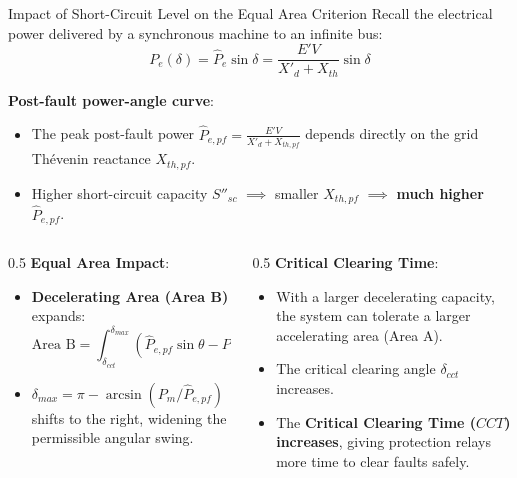 \begin{frame}[allowframebreaks]{Impact of Short-Circuit Level on the Equal Area Criterion}
Recall the electrical power delivered by a synchronous machine to an infinite bus:
$$P_e(\delta) = \hat{P}_e \sin \delta = \frac{E' V}{X'_d + X_{th}} \sin \delta$$

\textbf{Post-fault power-angle curve}:
\begin{itemize}
    \item The peak post-fault power $\hat{P}_{e,pf} = \frac{E' V}{X'_d + X_{th,pf}}$ depends directly on the grid Thévenin reactance $X_{th,pf}$.
    \item Higher short-circuit capacity $S''_{sc}$ $\implies$ smaller $X_{th,pf}$ $\implies$ \textbf{much higher $\hat{P}_{e,pf}$}.
\end{itemize}

\begin{columns}
    \begin{column}{0.5\textwidth}
    \textbf{Equal Area Impact}:
    \begin{itemize}
        \item \textbf{Decelerating Area (Area B)} expands:
        $$\text{Area B} = \int_{\delta_{cct}}^{\delta_{max}} (\hat{P}_{e,pf}\sin\theta - P_m) d\theta$$
        \item $\delta_{max} = \pi - \arcsin(P_m / \hat{P}_{e,pf})$ shifts to the right, widening the permissible angular swing.
    \end{itemize}
    \end{column}
    \begin{column}{0.5\textwidth}
    \textbf{Critical Clearing Time}:
    \begin{itemize}
        \item With a larger decelerating capacity, the system can tolerate a larger accelerating area (Area A).
        \item The critical clearing angle $\delta_{cct}$ increases.
        \item The \textbf{Critical Clearing Time ($CCT$) increases}, giving protection relays more time to clear faults safely.
    \end{itemize}
    \end{column}
\end{columns}
\end{frame}

